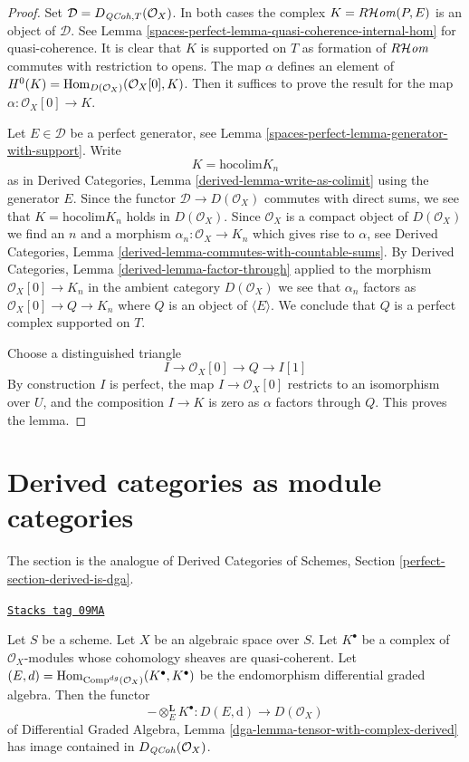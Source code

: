 \begin{proof}
Set $\mathcal{D} = D_{\mathit{QCoh}, T}(\mathcal{O}_X)$. In both cases the complex
$K = R\mathcal{H}\mathit{om}(P, E)$ is an object of $\mathcal{D}$. See
Lemma \ref{spaces-perfect-lemma-quasi-coherence-internal-hom} for quasi-coherence.
It is clear that $K$ is supported on $T$ as formation of $R\mathcal{H}\mathit{om}$
commutes with restriction to opens.
The map $\alpha$ defines an element of
$H^0(K) = \operatorname{Hom}_{D(\mathcal{O}_X)}(\mathcal{O}_X[0], K)$.
Then it suffices to prove the result for the map
$\alpha : \mathcal{O}_X[0] \to K$.

\medskip\noindent
Let $E \in \mathcal{D}$ be a perfect generator, see
Lemma \ref{spaces-perfect-lemma-generator-with-support}. Write
$$
K = \text{hocolim} K_n
$$
as in Derived Categories, Lemma \ref{derived-lemma-write-as-colimit}
using the generator $E$. Since the functor $\mathcal{D} \to D(\mathcal{O}_X)$
commutes with direct sums, we see that $K = \text{hocolim} K_n$
holds in $D(\mathcal{O}_X)$. Since $\mathcal{O}_X$ is a compact
object of $D(\mathcal{O}_X)$ we find an $n$ and a morphism
$\alpha_n : \mathcal{O}_X \to K_n$ which gives rise to $\alpha$, see
Derived Categories, Lemma \ref{derived-lemma-commutes-with-countable-sums}.
By Derived Categories, Lemma \ref{derived-lemma-factor-through}
applied to the morphism $\mathcal{O}_X[0] \to K_n$ in the ambient
category $D(\mathcal{O}_X)$ we see that $\alpha_n$ factors as
$\mathcal{O}_X[0] \to Q \to K_n$ where $Q$ is an object
of $\langle E \rangle$. We conclude that $Q$ is a perfect complex
supported on $T$.

\medskip\noindent
Choose a distinguished triangle
$$
I \to \mathcal{O}_X[0] \to Q \to I[1]
$$
By construction $I$ is perfect, the map $I \to \mathcal{O}_X[0]$
restricts to an isomorphism over $U$, and the composition
$I \to K$ is zero as $\alpha$ factors through $Q$.
This proves the lemma.
\end{proof}

\section{Derived categories as module categories}
\label{spaces-perfect-section-derived-is-dga}
The section is the analogue of
Derived Categories of Schemes, Section \ref{perfect-section-derived-is-dga}.

\begin{lemma}
\label{spaces-perfect-lemma-tensor-with-QCoh-complex}
\href{https://stacks.math.columbia.edu/tag/09MA}{\texttt{Stacks tag 09MA}}

Let $S$ be a scheme. Let $X$ be an algebraic space over $S$. Let $K^\bullet$
be a complex of $\mathcal{O}_X$-modules whose cohomology sheaves are
quasi-coherent. Let
$(E, d) = \operatorname{Hom}_{\text{Comp}^{dg}(\mathcal{O}_X)}(K^\bullet, K^\bullet)$
be the endomorphism differential graded algebra. Then the functor
$$
- \otimes_E^\mathbf{L} K^\bullet :
D(E, \text{d}) \longrightarrow D(\mathcal{O}_X)
$$
of
Differential Graded Algebra, Lemma
\ref{dga-lemma-tensor-with-complex-derived}
has image contained in $D_{\mathit{QCoh}}(\mathcal{O}_X)$.
\end{lemma}

